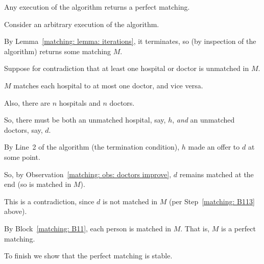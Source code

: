 \documentclass[11pt]{article}
\begin{document}
\begin{lemma}[\KT p.\,8 (1.5)]\label{matching: lemma: perfect}
  Any execution of the algorithm returns a perfect matching.
\end{lemma}
\begin{longFormProof}
  \step Consider an arbitrary execution of the algorithm.

  \step By Lemma~\ref{matching: lemma: iterations}, it terminates, so (by inspection of the algorithm) returns some matching $M$.

  \begin{block}[matching: B11]
     Suppose for contradiction that at least one hospital or doctor is unmatched in $M$.
    
    \step $M$ matches each hospital to at most one doctor, and vice versa.

    \step Also, there are $n$ hospitals and $n$ doctors.

    \step[matching: B113] So, there must be both an unmatched hospital, say, $h$, \emph{and} an unmatched doctors, say, $d$.

    \step By Line~2 of the algorithm (the termination condition), $h$ made an offer to $d$ at some point.

    \step So, by Observation~\ref{matching: obs: doctors improve}, $d$ remains matched at the end (so is matched in $M$).

    \step This is a contradiction, since $d$ is not matched in $M$ (per Step~\ref{matching: B113} above).
  \end{block}
  
  \step By Block~\ref{matching: B11}, each person is matched in $M$.  That is, $M$ is a perfect matching.
\end{longFormProof}

\continued

To finish we show that the perfect matching is stable. 
\end{document}
